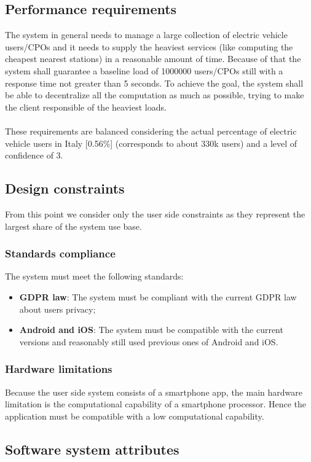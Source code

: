 \clearpage
\subsection{Performance requirements}
The system in general needs to manage a large collection of electric vehicle users/\acp{CPO} and it needs to supply the heaviest services (like computing the cheapest nearest stations) in a reasonable amount of time.
Because of that the system shall guarantee a baseline load of 1000000 users/\acp{CPO} still with a response time not greater than 5 seconds. To achieve the goal, the system shall be able to decentralize all the computation as much as possible,
trying to make the client responsible of the heaviest loads.\\\\
These requirements are balanced considering the actual percentage of electric vehicle users in Italy [0.56\%] (corresponds to about 330k users) and a level of confidence of 3.
\subsection{Design constraints}
From this point we consider only the user side constraints as they represent the largest share of the system use base.
\subsubsection{Standards compliance}
The system must meet the following standards:
\begin{itemize}
    \item \textbf{\ac{GDPR} law}: The system must be compliant with the current GDPR law about users privacy;
    \item \textbf{Android and iOS}: The system must be compatible with the current versions and reasonably still used previous ones of Android and iOS.
\end{itemize}
\subsubsection{Hardware limitations}
Because the user side system consists of a smartphone app, the main hardware limitation is the computational capability of a smartphone processor. Hence the
application must be compatible with a low computational capability.

\subsection{Software system attributes}

